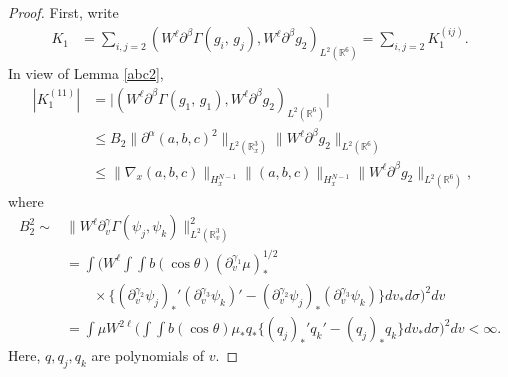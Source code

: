 \documentclass{amsart}[12pt, article]
\begin{document}
\begin{proof} First, write
\begin{align*}
K_1&=\sum_{i,j=2}(W^\ell{{\partial}}^\beta \Gamma(g_i,\,g_j), W^\ell{{\partial}}^\beta g_2)_{L^2({{{\mathbb R}}}^6)}
=\sum_{i,j=2}K_1^{(ij)}.
\end{align*}
In view of Lemma \ref{abc2},
\begin{align*}
|K_1^{(11)}|&=\big |(W^\ell{{\partial}}^\beta\Gamma(g_1,\,g_1), W^\ell{{\partial}}^\beta g_2)_{L^2({{{\mathbb R}}}^6)}\big|
 \\&\le B_2\|{{\partial}}^\alpha   (a,b,c)^2\|_{L^2({{{\mathbb R}}}^3_x)}\|W^\ell{{\partial}}^\beta g_2\|_{L^2({{{\mathbb R}}}^6)}
 \\& \le  \|\nabla_x (a,b,c)\|_{H^{N-1}_x}\|(a,b,c)\|_{H^{N-1}_x}
 \|W^\ell{{\partial}}^\beta g_2\|_{L^2({{{\mathbb R}}}^6)},\quad
 \end{align*}
 where
 \begin{align*}
 B_2^2 \sim &\|W^\ell{{\partial}}^{\gamma}_v\Gamma(\psi_j,\psi_k)\|_{L^2({{{\mathbb R}}}^3_v)}^2
\\
&=\int\big(W^\ell\int\int b(\cos\theta)({{\partial}}^{\gamma_1}_v\mu)_*^{1/2}
\\&\qquad \times \big\{ ({{\partial}}^{\gamma_2}_v\psi_j)_*' ({{\partial}}^{\gamma_3}_v\psi_k)'
-({{\partial}}^{\gamma_2}_v\psi_j)_* ({{\partial}}^{\gamma_3}_v\psi_k)\big\}dv_*d\sigma\big)^2dv
\\&
 =\int\mu W^{2\ell}\Big(\int\int b(\cos\theta)\mu_*q_*
\big\{ (q_j)_*' q_k'-(q_j)_*q_k\big\}dv_*d\sigma\Big)^2dv<\infty.
\end{align*}
Here, $q,q_j,q_k$ are polynomials of $v$.


\end{proof}
\end{document}
